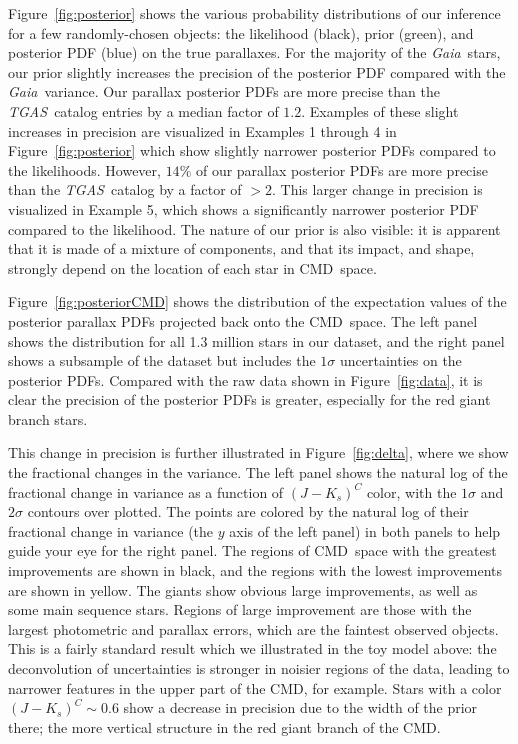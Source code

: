 \documentclass[modern]{aastex61}
\newcommand{\acronym}[1]{{\small{#1}}}
\newcommand{\project}[1]{\textsl{#1}}
\newcommand{\tgas}{\project{\acronym{TGAS}}}
\newcommand{\gaia}{\project{Gaia}}
\newcommand{\cmd}{\acronym{CMD}}
\begin{document}
Figure~\ref{fig:posterior} shows the various probability distributions of our inference for a few randomly-chosen objects: the likelihood (black), prior (green), and posterior PDF (blue) on the true parallaxes.
For the majority of the \gaia\ stars, our prior slightly increases the precision of the posterior PDF compared with the \gaia\ variance. Our parallax posterior PDFs are more precise than the \tgas\ catalog entries by a median factor of $1.2$. Examples of these slight increases in precision are visualized in Examples 1 through 4 in Figure~\ref{fig:posterior} which show slightly narrower posterior PDFs compared to the likelihoods.
However, $14\%$ of our parallax posterior PDFs are more precise than the \tgas\ catalog by a factor of $>2$. This larger change in precision is visualized in Example 5, which shows a significantly narrower posterior PDF compared to the likelihood.
The nature of our prior is also visible: it is apparent that it is made of a mixture of components, and that its impact, and shape, strongly depend on the location of each star in \cmd\ space.

Figure~\ref{fig:posteriorCMD} shows the distribution of the expectation values of the posterior parallax PDFs projected back onto the \cmd\ space.
The left panel shows the distribution for all 1.3 million stars in our dataset, and the right panel shows a subsample of the dataset but includes the $1\sigma$ uncertainties on the posterior PDFs.
Compared with the raw data shown in Figure~\ref{fig:data}, it is clear the precision of the posterior PDFs is greater, especially for the red giant branch stars.

This change in precision is further illustrated in Figure~\ref{fig:delta}, where we show the fractional changes in the variance. The left panel shows the natural log of the fractional change in variance as a function of $(J-K_s)^C$ color, with the $1\sigma$ and $2\sigma$ contours over plotted.
The points are colored by the natural log of their fractional change in variance (the $y$ axis of the left panel) in both panels to help guide your eye for the right panel. The regions of \cmd\ space with the greatest improvements are shown in black, and the regions with the lowest improvements are shown in yellow.
The giants show obvious large improvements, as well as some main sequence stars.
Regions of large improvement are those with the largest photometric and parallax errors, which are the faintest observed objects.
This is a fairly standard result which we illustrated in the toy model above: the deconvolution of uncertainties is stronger in noisier regions of the data, leading to narrower features in the upper part of the \cmd, for example.
Stars with a color $(J-K_s)^C \sim 0.6$ show a decrease in precision due to the width of the prior there; the more vertical structure in the red giant branch of the \cmd.
\end{document}
